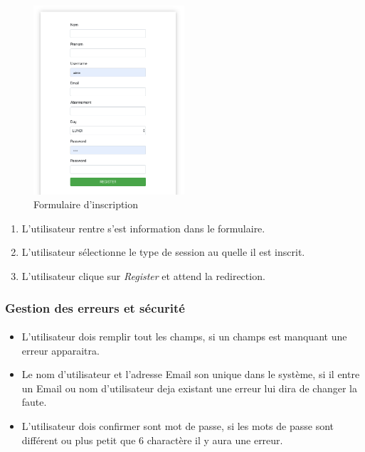 \begin{figure}[h]
	\includegraphics[width=0.5\textwidth,center]{Figures/us1-1}
	\caption{Formulaire d'inscription}
\end{figure}

\vspace{\baselineskip}
\begin{enumerate}
	\item L'utilisateur rentre s'est information dans le formulaire. 
	\item L'utilisateur sélectionne le type de session au quelle il est inscrit. 
	\item L'utilisateur clique sur \textit{Register} et attend la redirection. 
\end{enumerate}

\subsubsection{Gestion des erreurs et sécurité}
	\paragraph{}
		\begin{itemize}
			\item L'utilisateur dois remplir tout les champs, si un champs est manquant une erreur apparaitra. 
			\item Le nom d'utilisateur et l'adresse Email son unique dans le système, si il entre un Email ou nom d'utilisateur deja existant une erreur lui dira de changer la faute.
			\item L'utilisateur dois confirmer sont mot de passe, si les mots de passe sont différent ou plus petit que 6 charactère il y aura une erreur.
		\end{itemize}
		

